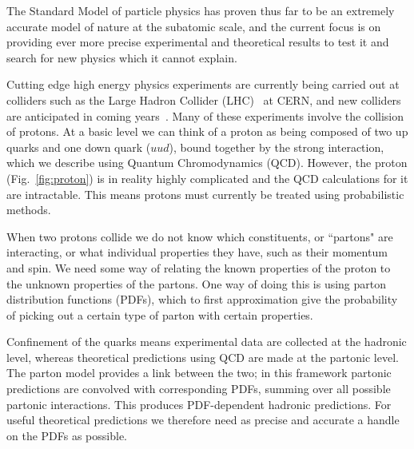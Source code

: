 \documentclass[a4paper,12pt,oneside,openright]{book}
\numberwithin{equation}{section}
\numberwithin{figure}{section}
\numberwithin{table}{section}
\begin{document}
The Standard Model of particle physics has proven thus
far to be an extremely accurate  model of nature at the subatomic scale, and the current focus is on providing ever more precise
experimental and theoretical results to test it and search for new physics which it cannot explain.

Cutting edge high energy physics experiments are currently being carried out at colliders such as the Large Hadron Collider
(LHC)~\cite{LHC} at CERN, and new colliders are anticipated in coming years~\cite{FCC, ILC, CLIC}. Many of these experiments involve the collision of protons. At a basic level we can think of
a proton as being composed of two up quarks and one down quark ($uud$), bound together by the strong
interaction, which we describe using Quantum Chromodynamics (QCD). However, the proton (Fig.~\ref{fig:proton}) is in reality
highly complicated and the QCD calculations for it are intractable. This means protons must currently be treated using probabilistic methods. 

When two protons collide we do not know which constituents,
or ``partons" are interacting, or what individual properties they have, such as their momentum and spin. We need
some way of relating the known properties of the proton to the unknown properties of the partons.
One way of doing this is using parton distribution functions (PDFs), which to first approximation give the
probability of picking out a certain type of parton with certain properties.

Confinement of the quarks means experimental data are collected at the hadronic level, whereas theoretical predictions using QCD are made at the partonic level. The parton model provides a
link between the two; in this framework partonic predictions
are convolved with corresponding PDFs, summing over all possible partonic interactions. This produces PDF-dependent
hadronic predictions. For useful theoretical predictions we therefore need as precise and accurate a handle on the PDFs as possible. 
\end{document}

